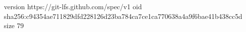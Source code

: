 version https://git-lfs.github.com/spec/v1
oid sha256:c94354ae711829dfd228126d23ba784ca7ce1ca770638a4a9f6bae41b438cc5d
size 79
